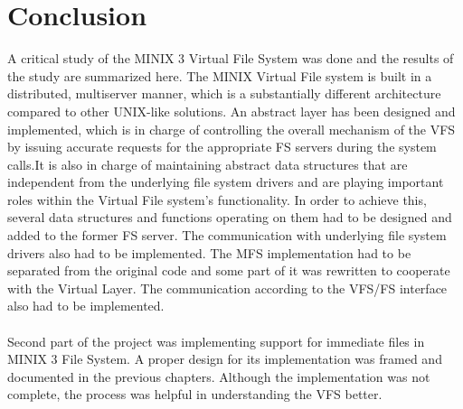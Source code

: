 \chapter{Conclusion}

A critical study of the MINIX 3 Virtual File System was done and the results of the study are summarized here. The MINIX Virtual File system is built in a distributed, multiserver manner, which is a substantially different architecture compared to other UNIX-like solutions. An abstract layer has been designed and implemented, which is in charge of controlling the overall mechanism of the VFS by issuing accurate requests for the appropriate FS servers during the system calls.It is also in charge of maintaining abstract data structures that are independent from the underlying file system drivers and are playing important roles within the Virtual File system’s functionality. In order to achieve this, several data structures and functions operating on them had to be designed and added to the former FS server. The communication with underlying file system drivers also had to be implemented. The MFS implementation had to be separated from the original code and some part of it was rewritten to cooperate with the Virtual Layer. The communication according to the VFS/FS interface also had to be implemented.\\
\\
Second part of the project was implementing support for immediate files in MINIX 3 File System. A proper design for its implementation was framed and documented in the previous chapters. Although the implementation was not complete, the process was helpful in understanding the VFS better.

